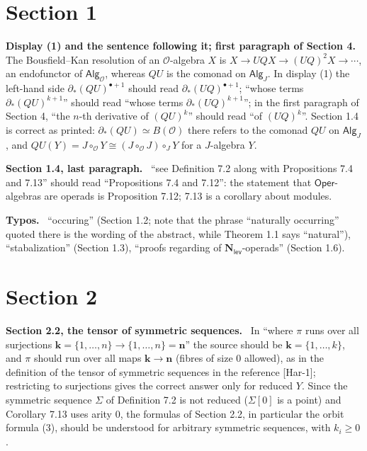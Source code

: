 \documentclass[12pt]{article}
\theoremstyle{plain}
\theoremstyle{definition}
\theoremstyle{remark}
\newcommand{\Cal}[1]{\mathcal{#1}}
\newcommand{\Alg}[1]{\mathsf{Alg}_{\mathcal{#1}}}
\newcommand{\Nl}{\mathbf{N}_{\mathsf{lev}}}
\newcommand{\Oper}{\mathsf{Oper}}
\newcommand{\corr}[1]{\par\smallskip\noindent\textbf{#1.}\ }
\begin{document}
\section*{Section 1}
\label{sec:s1}

\corr{Display (1) and the sentence following it; first paragraph of Section 4} The Bousfield--Kan resolution of an $\Cal O$-algebra $X$ is $X\to UQX\to(UQ)^2X\to\cdots$, an endofunctor of $\Alg{O}$, whereas $QU$ is the comonad on $\mathsf{Alg}_J$. In display (1) the left-hand side $\partial_*(QU)^{\bullet+1}$ should read $\partial_*(UQ)^{\bullet+1}$; ``whose terms $\partial_*(QU)^{k+1}$'' should read ``whose terms $\partial_*(UQ)^{k+1}$''; in the first paragraph of Section 4, ``the $n$-th derivative of $(QU)^k$'' should read ``of $(UQ)^k$''. Section 1.4 is correct as printed: $\partial_*(QU)\simeq B(\Cal O)$ there refers to the comonad $QU$ on $\mathsf{Alg}_J$, and $QU(Y)=J\circ_{\Cal O}Y\cong(J\circ_{\Cal O}J)\circ_JY$ for a $J$-algebra $Y$.

\corr{Section 1.4, last paragraph} ``see Definition 7.2 along with Propositions 7.4 and 7.13'' should read ``Propositions 7.4 and 7.12'': the statement that $\Oper$-algebras are operads is Proposition 7.12; 7.13 is a corollary about modules.

\corr{Typos} ``occuring'' (Section 1.2; note that the phrase ``naturally occurring'' quoted there is the wording of the abstract, while Theorem 1.1 says ``natural''), ``stabalization'' (Section 1.3), ``proofs regarding of $\Nl$-operads'' (Section 1.6).

\section*{Section 2}
\label{sec:s2}

\corr{Section 2.2, the tensor of symmetric sequences} In ``where $\pi$ runs over all surjections $\mathbf k=\{1,\dots,n\}\to\{1,\dots,n\}=\mathbf n$'' the source should be $\mathbf k=\{1,\dots,k\}$, and $\pi$ should run over all maps $\mathbf k\to\mathbf n$ (fibres of size $0$ allowed), as in the definition of the tensor of symmetric sequences in the reference [Har-1]; restricting to surjections gives the correct answer only for reduced $Y$. Since the symmetric sequence $\Sigma$ of Definition 7.2 is not reduced ($\Sigma[0]$ is a point) and Corollary 7.13 uses arity $0$, the formulas of Section 2.2, in particular the orbit formula (3), should be understood for arbitrary symmetric sequences, with $k_i\geq0$.
\end{document}
